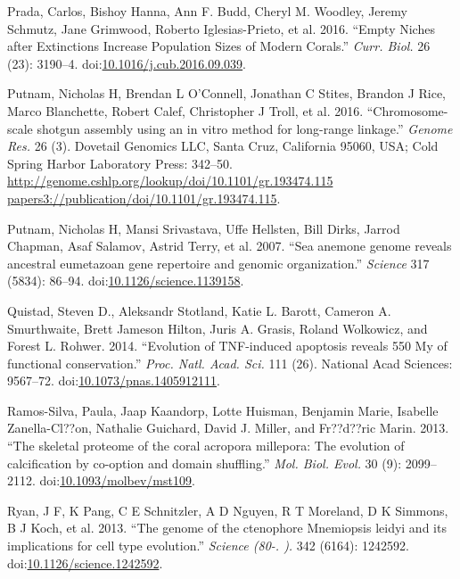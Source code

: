 \documentclass[]{elsarticle} %
\begin{document}
\hypertarget{ref-Prada2016a}{}
Prada, Carlos, Bishoy Hanna, Ann F. Budd, Cheryl M. Woodley, Jeremy
Schmutz, Jane Grimwood, Roberto Iglesias-Prieto, et al. 2016. ``Empty
Niches after Extinctions Increase Population Sizes of Modern Corals.''
\emph{Curr. Biol.} 26 (23): 3190--4.
doi:\href{https://doi.org/10.1016/j.cub.2016.09.039}{10.1016/j.cub.2016.09.039}.

\hypertarget{ref-Putnam2016a}{}
Putnam, Nicholas H, Brendan L O'Connell, Jonathan C Stites, Brandon J
Rice, Marco Blanchette, Robert Calef, Christopher J Troll, et al. 2016.
``Chromosome-scale shotgun assembly using an in vitro method for
long-range linkage.'' \emph{Genome Res.} 26 (3). Dovetail Genomics LLC,
Santa Cruz, California 95060, USA; Cold Spring Harbor Laboratory Press:
342--50.
\href{http://genome.cshlp.org/lookup/doi/10.1101/gr.193474.115\%20papers3://publication/doi/10.1101/gr.193474.115}{http://genome.cshlp.org/lookup/doi/10.1101/gr.193474.115 papers3://publication/doi/10.1101/gr.193474.115}.

\hypertarget{ref-Putnam2007}{}
Putnam, Nicholas H, Mansi Srivastava, Uffe Hellsten, Bill Dirks, Jarrod
Chapman, Asaf Salamov, Astrid Terry, et al. 2007. ``Sea anemone genome
reveals ancestral eumetazoan gene repertoire and genomic organization.''
\emph{Science} 317 (5834): 86--94.
doi:\href{https://doi.org/10.1126/science.1139158}{10.1126/science.1139158}.

\hypertarget{ref-Quistad2014}{}
Quistad, Steven D., Aleksandr Stotland, Katie L. Barott, Cameron A.
Smurthwaite, Brett Jameson Hilton, Juris A. Grasis, Roland Wolkowicz,
and Forest L. Rohwer. 2014. ``Evolution of TNF-induced apoptosis reveals
550 My of functional conservation.'' \emph{Proc. Natl. Acad. Sci.} 111
(26). National Acad Sciences: 9567--72.
doi:\href{https://doi.org/10.1073/pnas.1405912111}{10.1073/pnas.1405912111}.

\hypertarget{ref-Ramos-Silva2013}{}
Ramos-Silva, Paula, Jaap Kaandorp, Lotte Huisman, Benjamin Marie,
Isabelle Zanella-Cl??on, Nathalie Guichard, David J. Miller, and
Fr??d??ric Marin. 2013. ``The skeletal proteome of the coral acropora
millepora: The evolution of calcification by co-option and domain
shuffling.'' \emph{Mol. Biol. Evol.} 30 (9): 2099--2112.
doi:\href{https://doi.org/10.1093/molbev/mst109}{10.1093/molbev/mst109}.

\hypertarget{ref-Ryan2013}{}
Ryan, J F, K Pang, C E Schnitzler, A D Nguyen, R T Moreland, D K
Simmons, B J Koch, et al. 2013. ``The genome of the ctenophore
Mnemiopsis leidyi and its implications for cell type evolution.''
\emph{Science (80-. ).} 342 (6164): 1242592.
doi:\href{https://doi.org/10.1126/science.1242592}{10.1126/science.1242592}.
\end{document}
